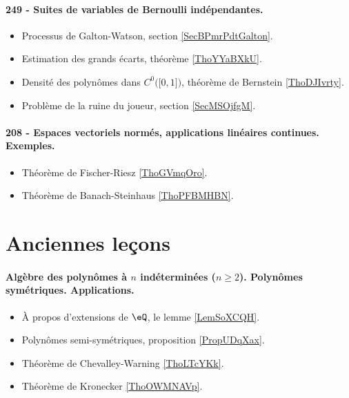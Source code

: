 \paragraph{249 - Suites de variables de Bernoulli indépendantes.}
\begin{itemize}
    \item Processus de Galton-Watson, section \ref{SecBPmrPdtGalton}.
    \item Estimation des grands écarts, théorème \ref{ThoYYaBXkU}.
    \item Densité des polynômes dans \( C^0\big( \mathopen[ 0 , 1 \mathclose] \big)\), théorème de Bernstein \ref{ThoDJIvrty}.
    \item Problème de la ruine du joueur, section \ref{SecMSOjfgM}.
\end{itemize}
\paragraph{208 - Espaces vectoriels normés, applications linéaires continues. Exemples.}
\begin{itemize}
    \item Théorème de Fischer-Riesz \ref{ThoGVmqOro}.
    \item Théorème de Banach-Steinhaus \ref{ThoPFBMHBN}.
\end{itemize}

\section{Anciennes leçons}


\paragraph{Algèbre des polynômes à \( n\) indéterminées (\( n\geq 2\)). Polynômes symétriques. Applications.}
\begin{itemize}
    \item À propos d'extensions de \( \eQ\), le lemme \ref{LemSoXCQH}.
    \item Polynômes semi-symétriques, proposition \ref{PropUDqXax}.
    \item Théorème de Chevalley-Warning \ref{ThoLTcYKk}.
    \item Théorème de Kronecker \ref{ThoOWMNAVp}.
\end{itemize}

